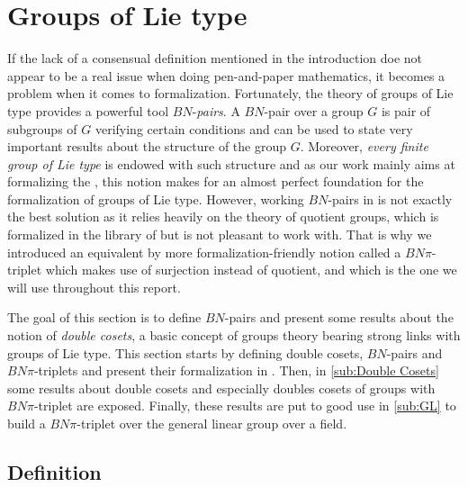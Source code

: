 \section{Groups of Lie type}
\label{sec:BN}



If the lack of a consensual definition mentioned in the introduction doe not appear to be a real issue when doing pen-and-paper mathematics, it becomes a problem when it comes to formalization. Fortunately, the theory of groups of Lie type provides a powerful tool $BN$-\emph{pairs}. A $BN$-pair over a group $G$ is pair of subgroups of $G$ verifying certain conditions and can be used to state very important results about the structure of the group $G$. Moreover, \emph{every finite group of Lie type} is endowed with such structure and as our work mainly aims at formalizing the \CFSG, this notion makes for an almost perfect foundation for the formalization of groups of Lie type. 
However, working $BN$-pairs in \Lean is not exactly the best solution as it relies heavily on the theory of quotient groups, which is formalized in the \href{https://github.com/leanprover-community/mathlib4}{} library of \Lean but is not pleasant to work with. That is why we introduced an equivalent by more formalization-friendly notion called a $BN\pi$-triplet which makes use of surjection instead of quotient, and which is the one we will use throughout this report.

The goal of this section is to define $BN$-pairs and present some results about the notion of \emph{double cosets}, a basic concept of groups theory bearing strong links with groups of Lie type. This section starts by defining double cosets, $BN$-pairs and $BN\pi$-triplets and present their formalization in \Lean. Then, in \ref{sub:Double Cosets} some results about double cosets and especially doubles cosets of groups with $BN\pi$-triplet are exposed. Finally, these results are put to good use in \ref{sub:GL} to build a $BN\pi$-triplet over the general linear group over a field.

\subsection{Definition}%

